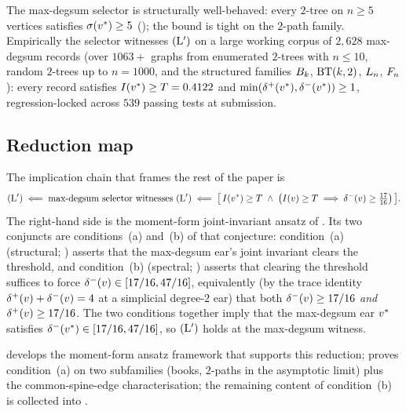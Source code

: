 The max-degsum selector is structurally well-behaved: every $2$-tree
on $n \ge 5$ vertices satisfies $\sigma(v^{*}) \ge 5$
(); the bound is tight on the $2$-path family.
Empirically the selector witnesses $(\mathrm{L}')$ on a large working corpus
of $2{,}628$ max-degsum records (over $1063+$ graphs from enumerated
$2$-trees with $n \le 10$, random $2$-trees up to $n = 1000$, and the
structured families $B_{k}$, $\mathrm{BT}(k,2)$, $L_{n}$, $F_{n}$): every record
satisfies $I(v^{*}) \ge T = 0.4122$ and
$\min(\delta^{+}(v^{*}), \delta^{-}(v^{*})) \ge 1$, regression-locked
across $539$ passing tests at submission.

\subsection{Reduction map}\label{sec:lprime:reduction}

The implication chain that frames the rest of the paper is
\[
(\mathrm{L}') \;\Longleftarrow\; \text{max-degsum selector witnesses $(\mathrm{L}')$}
\;\Longleftarrow\;
\bigl[\, I(v^{*}) \ge T \;\wedge\;
\bigl(I(v) \ge T \;\Longrightarrow\; \delta^{-}(v) \ge \tfrac{17}{16}\bigr) \,\bigr].
\]
The right-hand side is the moment-form joint-invariant ansatz of
. Its two conjuncts are conditions~(a) and~(b)
of that conjecture: condition~(a) (structural; ) asserts
that the max-degsum ear's joint invariant clears the threshold, and
condition~(b) (spectral; ) asserts that clearing the
threshold suffices to force $\delta^{-}(v) \in [17/16, 47/16]$,
equivalently (by the trace identity $\delta^{+}(v) + \delta^{-}(v) = 4$ at a
simplicial degree-$2$ ear) that both $\delta^{-}(v) \ge 17/16$ \emph{and}
$\delta^{+}(v) \ge 17/16$. The two conditions together imply that the
max-degsum ear $v^{*}$ satisfies $\delta^{-}(v^{*}) \in [17/16, 47/16]$,
so $(\mathrm{L}')$ holds at the max-degsum witness.

 develops the moment-form ansatz framework
that supports this reduction;  proves
condition~(a) on two subfamilies (books, $2$-paths in the asymptotic
limit) plus the common-spine-edge characterisation; the remaining
content of condition~(b) is collected into .
